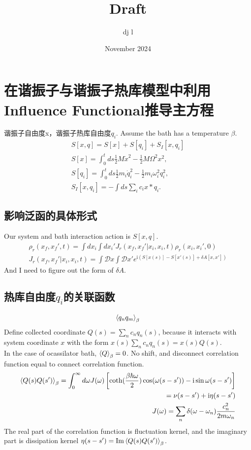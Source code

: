 \documentclass{article}
\title{Draft}
\author{dj l}
\date{November 2024}
\begin{document}
\section{在谐振子与谐振子热库模型中利用Influence Functional推导主方程}
谐振子自由度x，谐振子热库自由度$q_i$. Assume the bath has a temperature $\beta$.
\begin{align}
    S[x,q]=S[x]+S[q_i]+S_I[x,q_i]\\
    S[x]=\int_0^t ds \frac{1}{2}M\dot{x}^2-\frac{1}{2}M\Omega^2 x^2,\\
    S[q_i]=\int_0^tds\frac{1}{2}m_i \dot{q}_i^2-\frac{1}{2}m_i\omega_i^2q_i^2,\\
    S_I[x,q_i]=-\int ds \sum_i c_i x*q_i.
\end{align}
\subsection{影响泛函的具体形式}
Our system and bath interaction action is $S[x,q]$.
\begin{align*}
     \rho_r(x_f,x_f',t)=\int dx_i\int dx_i' J_r(x_f,x_f'|x_i,x_i,t)\rho_r(x_i,x_i',0)\\
     J_r(x_f,x_f'|x_i,x_i,t)=\int \mathcal{D}x\int\mathcal{D}x' e^{\mathrm{i}(S[x(s)]-S[x'(s)]+\delta A[x,x'])}
\end{align*}
And I need to figure out the form of $\delta A$.
\subsection{热库自由度$q_i$的关联函数}
\begin{equation}
    \braket{q_n q_m}_\beta
\end{equation}
Define collected coordinate $ Q(s)=\sum_n c_n q_n(s)$, because it interacts with system coordinate $x$ with the form $x(s)\sum_n c_n q_n(s)= x(s)Q(s)$.\\
In the case of ocassilator bath, $\braket{Q}_\beta=0$. No shift, and disconnect correlation function equal to connect correlation function.
\begin{equation}
    \begin{split}
         \braket{Q(s) Q(s')}_\beta=\int_0^\infty d\omega J(\omega)\left[\coth(\frac{\beta\hbar\omega}{2})\cos(\omega(s-s')
             )-\mathrm{i}\sin\omega(s-s')\right]\\
             =\nu(s-s')+\mathrm{i}\eta(s-s')\\
             J(\omega)=\sum_n\delta(\omega-\omega_n)\frac{c_n^2}{2m\omega_n}\label{eq:correlation function}
    \end{split}
\end{equation}
The real part of the correlation function is fluctuation kernel, and the imaginary part is dissipation kernel $\eta(s-s')=\operatorname{Im} \braket{Q(s) Q(s')}_\beta$. 
\end{document}
